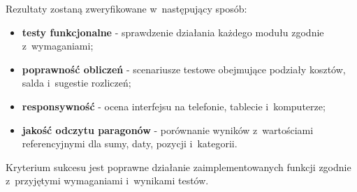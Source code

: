 Rezultaty zostaną zweryfikowane w~następujący sposób:

\begin{itemize}
  \item \textbf{testy funkcjonalne} - sprawdzenie działania każdego modułu zgodnie z~wymaganiami;
  \item \textbf{poprawność obliczeń} - scenariusze testowe obejmujące podziały kosztów, salda i~sugestie rozliczeń;
  \item \textbf{responsywność} - ocena interfejsu na telefonie, tablecie i~komputerze;
  \item \textbf{jakość odczytu paragonów} - porównanie wyników z~wartościami referencyjnymi dla sumy, daty, pozycji i~kategorii.
\end{itemize}

Kryterium sukcesu jest poprawne działanie zaimplementowanych funkcji zgodnie z~przyjętymi wymaganiami i~wynikami testów.
